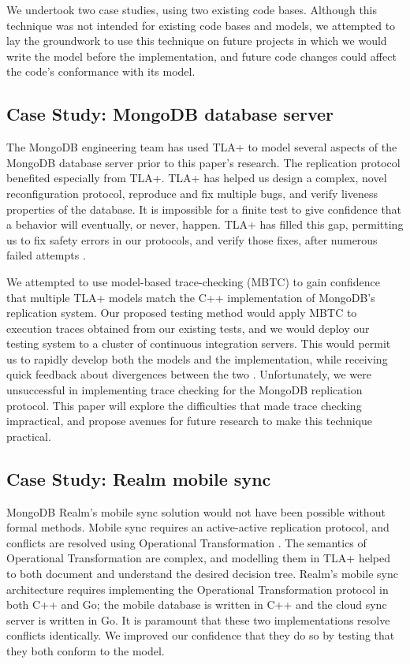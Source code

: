 \documentclass{vldb}
\begin{document}
We undertook two case studies, using two existing code bases.
Although this technique was not intended for existing code bases and models, we attempted to lay the groundwork to use this technique on future projects in which we would write the model before the implementation, and future code changes could affect the code's conformance with its model.

\subsection{Case Study: MongoDB database server}

The MongoDB engineering team has used TLA+ to model several aspects of the MongoDB database server prior to this paper's research.
The replication protocol benefited especially from TLA+.
TLA+ has helped us design a complex, novel reconfiguration protocol, reproduce and fix multiple bugs, and verify liveness properties of the database. 
It is impossible for a finite test to give confidence that a behavior will eventually, or never, happen. 
TLA+ has filled this gap, permitting us to fix safety errors in our protocols, and verify those fixes, after numerous failed attempts \cite{Schultz19BugsLife}. 

We attempted to use model-based trace-checking (MBTC) \cite{MBTC} to gain confidence that multiple TLA+ models match the C++ implementation of MongoDB's replication system.
Our proposed testing method would apply MBTC to execution traces obtained from our existing tests, and we would deploy our testing system to a cluster of continuous integration servers.
This would permit us to rapidly develop both the models and the implementation, while receiving quick feedback about divergences between the two \cite{Gravell11ConcurrentDevelopmentOfModelAndImplementation}.
Unfortunately, we were unsuccessful in implementing trace checking for the MongoDB replication protocol. This paper will explore the difficulties that made trace checking impractical, and propose avenues for future research to make this technique practical.

\subsection{Case Study: Realm mobile sync}

MongoDB Realm's mobile sync solution would not have been possible without formal methods. 
Mobile sync requires an active-active replication protocol, and conflicts are resolved using Operational Transformation \cite{Stigsen19RealmPatent}.
The semantics of Operational Transformation are complex, and modelling them in TLA+ helped to both document and understand the desired decision tree.
Realm's mobile sync architecture requires implementing the Operational Transformation protocol in both C++ and Go; the mobile database is written in C++ and the cloud sync server is written in Go.
It is paramount that these two implementations resolve conflicts identically.
We improved our confidence that they do so by testing that they both conform to the model.
\end{document}
